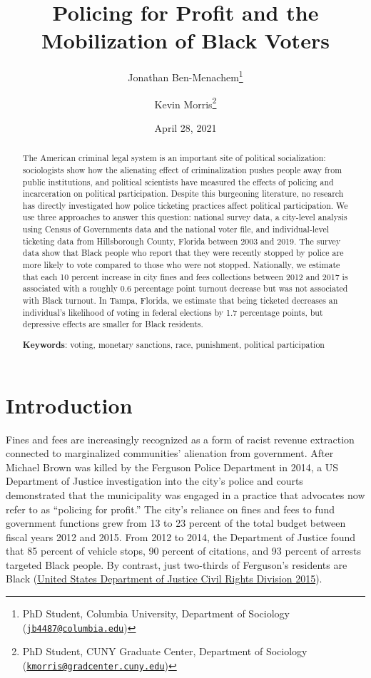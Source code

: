 \documentclass[
  12pt,
]{article}
\title{Policing for Profit and the Mobilization of Black Voters}
\author{Jonathan Ben-Menachem\footnote{PhD Student, Columbia University, Department of Sociology (\href{mailto:jb4487@columbia.edu}{\nolinkurl{jb4487@columbia.edu}})} \and Kevin Morris\footnote{PhD Student, CUNY Graduate Center, Department of Sociology (\href{mailto:kmorris@gradcenter.cuny.edu}{\nolinkurl{kmorris@gradcenter.cuny.edu}})}}
\date{April 28, 2021}
\begin{document}
\maketitle
\begin{abstract}
The American criminal legal system is an important site of political socialization: sociologists show how the alienating effect of criminalization pushes people away from public institutions, and political scientists have measured the effects of policing and incarceration on political participation. Despite this burgeoning literature, no research has directly investigated how police ticketing practices affect political participation. We use three approaches to answer this question: national survey data, a city-level analysis using Census of Governments data and the national voter file, and individual-level ticketing data from Hillsborough County, Florida between 2003 and 2019. The survey data show that Black people who report that they were recently stopped by police are more likely to vote compared to those who were not stopped. Nationally, we estimate that each 10 percent increase in city fines and fees collections between 2012 and 2017 is associated with a roughly 0.6 percentage point turnout decrease but was not associated with Black turnout. In Tampa, Florida, we estimate that being ticketed decreases an individual's likelihood of voting in federal elections by 1.7 percentage points, but depressive effects are smaller for Black residents.

\hfill\break

\textbf{Keywords}: voting, monetary sanctions, race, punishment, political participation
\end{abstract}

\pagebreak

\doublespacing

\hypertarget{introduction}{%
\section*{Introduction}\label{introduction}}

Fines and fees are increasingly recognized as a form of racist revenue extraction connected to marginalized communities' alienation from government. After Michael Brown was killed by the Ferguson Police Department in 2014, a US Department of Justice investigation into the city's police and courts demonstrated that the municipality was engaged in a practice that advocates now refer to as ``policing for profit.'' The city's reliance on fines and fees to fund government functions grew from 13 to 23 percent of the total budget between fiscal years 2012 and 2015. From 2012 to 2014, the Department of Justice found that 85 percent of vehicle stops, 90 percent of citations, and 93 percent of arrests targeted Black people. By contrast, just two-thirds of Ferguson's residents are Black (\protect\hyperlink{ref-UnitedStatesDepartmentofJusticeCivilRightsDivision2015}{United States Department of Justice Civil Rights Division 2015}).
\end{document}
